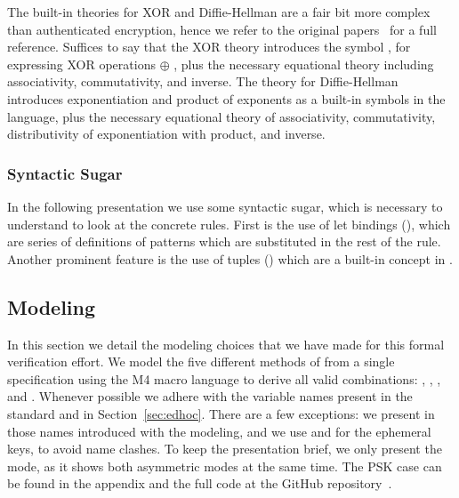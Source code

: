 The built-in theories for XOR and Diffie-Hellman are a fair bit more complex
than authenticated encryption, hence we refer to the original
papers~\cite{DBLP:conf/csfw/DreierHRS18,DBLP:conf/csfw/SchmidtMCB12}
for a full reference.
%
Suffices to say that the XOR theory introduces the symbol , for
expressing XOR operations  $\oplus$ , plus the necessary equational theory
including associativity, commutativity, and inverse.
%
The theory for Diffie-Hellman introduces exponentiation  and product of
exponents  as a built-in symbols in the language, plus the necessary equational
theory of associativity, commutativity, distributivity of exponentiation with
product, and inverse.

\spacehack
\subsubsection{Syntactic Sugar} In the following presentation we use some syntactic
sugar, which is necessary to understand to look at the concrete rules. First is
the use of let bindings (), which are series of
definitions of patterns which are substituted in the rest of the rule. Another
prominent feature is the use of tuples () which are a
built-in concept in \mTamarin.

\spacehack
\subsection{Modeling \mEdhoc{}}
\fillhack
In this section we detail the modeling choices that we have made for this formal
verification effort.
%
We model the five different methods of \mEdhoc{} from a single specification
using the M4 macro language to derive all valid combinations: \mPskPsk,
\mSigSig, \mSigStat, \mStatSig{} and \mStatStat.
%
Whenever possible we adhere with the variable names present in the standard and
in Section~\ref{sec:edhoc}. There are a few exceptions: we present in
 those names introduced with the modeling, and we use  and
 for the ephemeral keys, to avoid name clashes.
%
%
To keep the presentation brief, we only present the \mStatSig{} mode, as it
shows both asymmetric modes at the same time. The PSK case can be found in the
appendix and the full code at the GitHub repository~\cite{edhocTamarinRepo}.
\spacehack
